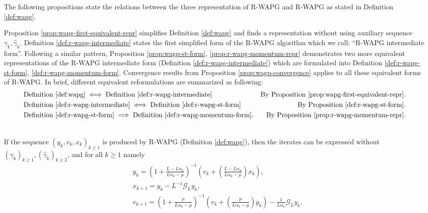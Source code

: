 \documentclass[12pt]{article}
\begin{document}
        The following propositions state the relations between the three representation of R-WAPG and R-WAPG as stated in Definition \ref{def:wapg}. 
        \par
        Proposition \ref{prop:wapg-first-equivalent-repr} simplifies Definition \ref{def:wapg} and finds a representation without using auxiliary sequence $\gamma_k, \hat \gamma_k$. 
        Definition \ref{def:r-wapg-intermediate} states the first simplified form of the R-WAPG algorithm which we call: ``R-WAPG intermediate form''. 
        Following a similar pattern, Proposition \ref{prop:wagp-st-form}, \ref{prop:r-wapg-momentum-repr} demonstrates two more equivalent representations of the R-WAPG intermediate form (Definition \ref{def:r-wapg-intermediate}) which are formulated into Definition \ref{def:r-wapg-st-form}, \ref{def:r-wapg-momentum-form}. 
        Convergence results from Proposition \ref{prop:wagp-convergence} applies to all these equivalent forms of R-WAPG. 
        In brief, different equivalent reformulations are summarized as following: 
        \begin{align*}
            &\text{Definition \ref{def:wapg}}   \iff 
            \text{Definition \ref{def:r-wapg-intermediate}}  & \text{By Proposition \ref{prop:wapg-first-equivalent-repr}.}
            \\
            & \text{Definition \ref{def:r-wapg-intermediate}}
            \iff \text{Definition \ref{def:r-wapg-st-form}} & \text{By Proposition \ref{def:r-wapg-st-form}.}
            \\
            & 
            \text{Definition \ref{def:r-wapg-st-form}}\implies 
            \text{Definition }\ref{def:r-wapg-momentum-form}. 
            & \text{By Proposition }\ref{prop:r-wapg-momentum-repr}.
        \end{align*}
        \begin{proposition}\label{prop:wapg-first-equivalent-repr}\;\\
            If the sequence $(y_k, v_k, x_k)_{k \ge 1}$ is produced by R-WAPG (Definition \ref{def:wapg}), 
            then the iterates can be expressed without $(\gamma_k)_{k \ge1},(\hat \gamma_k)_{k \ge 2}$, and for all $k\ge 1$ namely
            \begin{align*}
                & 
                y_{k} = 
                \left(
                    1 + \frac{L - L\alpha_{k}}{L\alpha_{k} - \mu}
                \right)^{-1}
                \left(
                    v_{k} + 
                    \left(\frac{L - L\alpha_{k}}{L\alpha_{k} - \mu} \right) x_{k}
                \right), 
                \\
                & x_{k + 1} = 
                y_k - L^{-1} \mathcal G_L y_k, 
                \\
                & v_{k + 1} = 
                \left(
                    1 + \frac{\mu}{L \alpha_k - \mu}
                \right)^{-1}
                \left(
                    v_k + 
                    \left(\frac{\mu}{L \alpha_k - \mu}\right) y_k
                \right) - \frac{1}{L\alpha_{k}}\mathcal G_L y_k. 
            \end{align*}
        \end{proposition}
\end{document}
